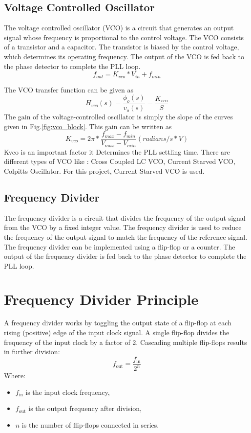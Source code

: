 \subsection{Voltage Controlled Oscillator}
The voltage controlled oscillator (VCO) is a circuit that generates an output signal whose frequency is proportional to the control voltage. The VCO consists of a transistor and a capacitor. The transistor is biased by the control voltage, which determines its operating frequency. The output of the VCO is fed back to the phase detector to complete the PLL loop.
\begin{equation}
	\label{eq:vco_char}
	f_{out} = K_{vco} * V_{in} + f_{min}
\end{equation}

The VCO transfer function can be given as
\begin{equation}
	\label{eq:vco_tf}
	H_{vco}(s) = \frac{\phi_{o}(s)}{v_{o}(s)} = \frac{K_{vco}}{S}
\end{equation}
The gain of the voltage-controlled oscillator is simply the slope of the curves given in Fig.\ref{fig:vco_block}. This gain can be written as
\begin{equation}
	\label{eq:vco_gain}
	K_{vco} = 2\pi  * \frac{f_{max} - f_{min}}{V_{max} - V_{min}}(radians/s * V)
\end{equation}
Kvco is an important factor it Determines the PLL settling time.
There are different types of VCO like : Cross Coupled LC VCO, Current Starved VCO, Colpitts Oscillator. For this project, Current Starved VCO is used.
\subsection{Frequency Divider}
The frequency divider is a circuit that divides the frequency of the output signal from the VCO by a fixed integer value. The frequency divider is used to reduce the frequency of the output signal to match the frequency of the reference signal. The frequency divider can be implemented using a flip-flop or a counter. The output of the frequency divider is fed back to the phase detector to complete the PLL loop.
\section*{Frequency Divider Principle}
A frequency divider works by toggling the output state of a flip-flop at each rising (positive) edge of the input clock signal. A single flip-flop divides the frequency of the input clock by a factor of 2. Cascading multiple flip-flops results in further division:
\[
f_{\text{out}} = \frac{f_{\text{in}}}{2^n}
\]
Where:
\begin{itemize}
    \item $f_{\text{in}}$ is the input clock frequency,
    \item $f_{\text{out}}$ is the output frequency after division,
    \item $n$ is the number of flip-flops connected in series.
\end{itemize}


